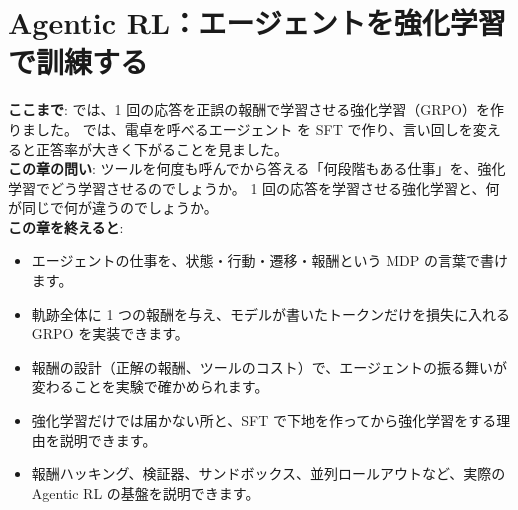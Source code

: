 \chapter{Agentic RL：エージェントを強化学習で訓練する}\label{ch:agentic-rl}

\begin{chapterlead}
\textbf{ここまで}: では、1 回の応答を正誤の報酬で学習させる強化学習（GRPO）を作りました。
では、電卓を呼べるエージェント  を SFT で作り、言い回しを変えると正答率が大きく下がることを見ました。\\
\textbf{この章の問い}: ツールを何度も呼んでから答える「何段階もある仕事」を、強化学習でどう学習させるのでしょうか。
1 回の応答を学習させる強化学習と、何が同じで何が違うのでしょうか。\\[1mm]
\textbf{この章を終えると}:
\begin{itemize}
\item エージェントの仕事を、状態・行動・遷移・報酬という MDP の言葉で書けます。
\item 軌跡全体に 1 つの報酬を与え、モデルが書いたトークンだけを損失に入れる GRPO を実装できます。
\item 報酬の設計（正解の報酬、ツールのコスト）で、エージェントの振る舞いが変わることを実験で確かめられます。
\item 強化学習だけでは届かない所と、SFT で下地を作ってから強化学習をする理由を説明できます。
\item 報酬ハッキング、検証器、サンドボックス、並列ロールアウトなど、実際の Agentic RL の基盤を説明できます。
\end{itemize}
\end{chapterlead}

